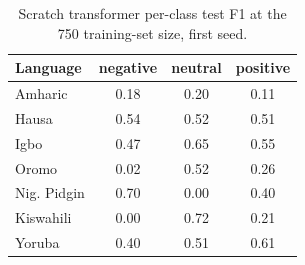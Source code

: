 \begin{table}[t]
\centering
\caption{Scratch transformer per-class test F1 at the 750 training-set size, first seed.}
\label{tab:scratch_per_class_f1_750}
\small
\begin{tabular}{lccc}
\toprule
Language & negative & neutral & positive \\
\midrule
Amharic & 0.18 & 0.20 & 0.11 \\
Hausa & 0.54 & 0.52 & 0.51 \\
Igbo & 0.47 & 0.65 & 0.55 \\
Oromo & 0.02 & 0.52 & 0.26 \\
Nig. Pidgin & 0.70 & 0.00 & 0.40 \\
Kiswahili & 0.00 & 0.72 & 0.21 \\
Yoruba & 0.40 & 0.51 & 0.61 \\
\bottomrule
\end{tabular}
\end{table}